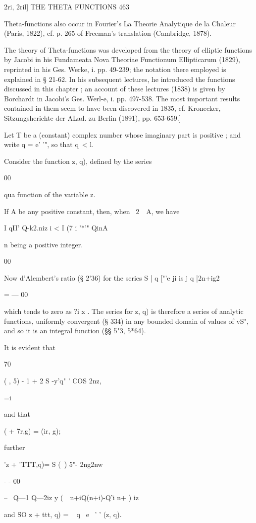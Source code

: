 2ri, 2ril] THE THETA FUNCTIONS 463

Theta-functions also occur in Fourier's La Theorie Analytique de la
Chaleur (Paris, 1822), cf. p. 265 of Freeman's translation (Cambridge,
1878).

The theory of Theta-functions was developed from the theory of
elliptic functions by Jacobi in his Fundameata Nova Theoriae
Functionum Ellipticarum (1829), reprinted in his Ges. Werke, i. pp.
49-239; the notation there employed is explained in § 21-62. In his
subsequent lectures, he introduced the functions discussed in this
chapter ; an account of these lectures (1838) is given by Borchardt in
Jacobi's Ges. Werl-e, i. pp. 497-538. The most important results
contained in them seem to have been discovered in 1835, cf. Kronecker,
Sitzungsherichte der ALad. zu Berlin (1891), pp. 653-659.]

Let T be a (constant) complex number whose imaginary part is positive
; and write q = e' '", so that q\ < l.

Consider the function z, q), defined by the series

00

qua function of the variable z.

If A be any positive constant, then, when \ 2\ \ A, we have

I qII' Q-k2.niz i < I (7 i '*'" QinA

n being a positive integer.

00

Now d'Alembert's ratio (§ 2'36) for the series S | q ["'e ji is j q
|2n+ig2

  = — 00

which tends to zero as ?i x . The series for z, q) is therefore a
series of analytic functions, uniformly convergent (§ 334) in any
bounded domain of values of vS", and so it is an integral function (§§
5"3, 5*64).

It is evident that

 70

  ( , 5) - 1 + 2 S -y'q" ' COS 2nz,

 =i

and that

 ( + 7r,g) = (ir, g);

further

'z + 'TTT,q)= S (\ ) 5"- 2ng2nw

 - - 00

-- \ Q—1 Q—2iz y (\ \ n+iQ(n+i)-Q'i n+ ) iz

and SO z + ttt, q) = ~ q~ e~ ' ' (z, q).

